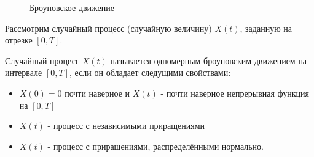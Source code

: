 \begin{figure}[ph!]
	\caption{Броуновское движение}
	\label{fig:brown_movement}
\end{figure}

Рассмотрим случайный процесс (случайную величину) $X(t)$, заданную на отрезке $[0,T]$.

Случайный процесс  $X(t)$ называется одномерным броуновским движением на интервале $[0,T]$, если он обладает следущими свойствами:
\begin{itemize} 
	\item $X(0) = 0$ почти наверное и $X(t)$ - почти наверное непрерывная функция на $[0,T]$
	\item $X(t)$ - процесс с независимыми приращениями
	\item  $X(t)$ -  процесс с приращениями, распределёнными нормально.
\end{itemize}

